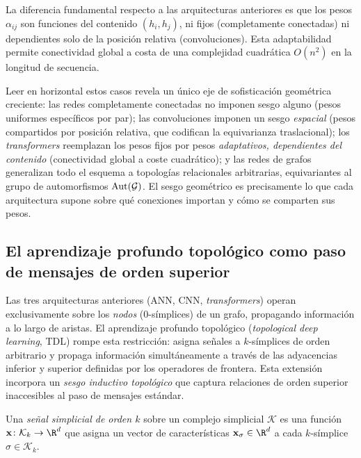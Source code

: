 La diferencia fundamental respecto a las arquitecturas anteriores es que los pesos
$\alpha_{ij}$ son funciones del contenido $(h_i, h_j)$, ni fijos (completamente
conectadas) ni dependientes solo de la posici\'on relativa (convoluciones). Esta
adaptabilidad permite conectividad global a costa de una complejidad cuadr\'atica
$O(n^2)$ en la longitud de secuencia.

Leer en horizontal estos casos revela un \'unico eje de sofisticaci\'on
geom\'etrica creciente: las redes completamente conectadas no imponen sesgo
alguno (pesos uniformes espec\'ificos por par); las convoluciones imponen un sesgo
\emph{espacial} (pesos compartidos por posici\'on relativa, que codifican la
equivarianza traslacional); los \emph{transformers} reemplazan los pesos fijos por
pesos \emph{adaptativos, dependientes del contenido} (conectividad global a coste
cuadr\'atico); y las redes de grafos generalizan todo el esquema a topolog\'ias
relacionales arbitrarias, equivariantes al grupo de automorfismos
$\operatorname{Aut}(\mathcal{G})$. El sesgo geom\'etrico es precisamente lo que cada
arquitectura supone sobre qu\'e conexiones importan y c\'omo se comparten sus
pesos.

\subsection{El aprendizaje profundo topol\'ogico como paso de mensajes de orden superior}
\label{sec:priors:tdl}

Las tres arquitecturas anteriores (ANN, CNN, \emph{transformers}) operan
exclusivamente sobre los \emph{nodos} ($0$-s\'implices) de un grafo, propagando
informaci\'on a lo largo de aristas. El aprendizaje profundo topol\'ogico
(\emph{topological deep learning}, TDL) rompe esta restricci\'on: asigna se\~nales
a $k$-s\'implices de orden arbitrario y propaga informaci\'on simult\'aneamente a
trav\'es de las adyacencias inferior y superior definidas por los operadores de
frontera. Esta extensi\'on incorpora un \emph{sesgo inductivo topol\'ogico} que
captura relaciones de orden superior inaccesibles al paso de mensajes est\'andar.

\begin{definition}
\label{def:priors:simplicial-signal}
Una \emph{se\~nal simplicial de orden $k$} sobre un complejo simplicial
$\mathcal{K}$ es una funci\'on $\mathbf{x} \colon \mathcal{K}_k \to \R^d$ que
asigna un vector de caracter\'isticas $\mathbf{x}_\sigma \in \R^d$ a cada
$k$-s\'implice $\sigma \in \mathcal{K}_k$.
\end{definition}

